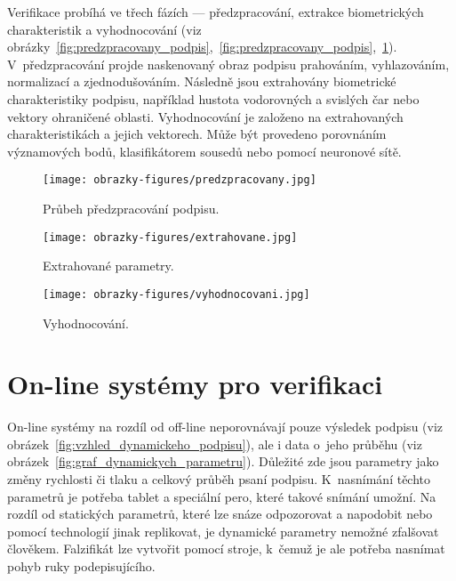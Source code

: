 Verifikace probíhá ve třech fázích --- předzpracování, extrakce biometrických charakteristik a vyhodnocování (viz obrázky~\ref{fig:predzpracovany_podpis},~\ref{fig:predzpracovany_podpis},~\ref{fig:vyhodnocovani}). %
V~předzpracování projde naskenovaný obraz podpisu prahováním, vyhlazováním, normalizací a zjednodušováním. %
Následně jsou extrahovány biometrické charakteristiky podpisu,                                             %
například hustota vodorovných a svislých čar nebo vektory ohraničené oblasti.                              %
Vyhodnocování je založeno na extrahovaných charakteristikách a jejich vektorech.                           %
Může být provedeno porovnáním významových bodů, klasifikátorem sousedů nebo  pomocí neuronové sítě.\cite{RakRoman2008}%

\begin{figure}[H]
  \centering
  \begin{minipage}{1\textwidth}
    \centering
    \texttt{[image: obrazky-figures/predzpracovany.jpg]}
    \caption{Průbeh předzpracování podpisu.~\cite{DrahanskýMartin2011}}
    \label{fig:predzpracovany_podpis}
  \end{minipage}\hfill
  \begin{minipage}{0.35\textwidth}
    \centering
    \texttt{[image: obrazky-figures/extrahovane.jpg]}
    \caption{Extrahované parametry.~\cite{RakRoman2008}}
    \label{fig:extrahovany}
  \end{minipage}\hfill
  \begin{minipage}{0.6\textwidth}
    \centering
    \texttt{[image: obrazky-figures/vyhodnocovani.jpg]}
    \caption{Vyhodnocování.~\cite{RakRoman2008}}
    \label{fig:vyhodnocovani}
  \end{minipage}
\end{figure}


\section{On-line systémy pro verifikaci} 
On-line systémy na rozdíl od off-line neporovnávají pouze výsledek podpisu (viz obrázek~\ref{fig:vzhled_dynamickeho_podpisu}), ale i data o~jeho průběhu (viz obrázek~\ref{fig:graf_dynamickych_parametru}). %
Důležité zde jsou parametry jako změny rychlosti či tlaku a celkový průběh psaní podpisu.     %
K~nasnímání těchto parametrů je potřeba tablet a speciální pero, které takové snímání umožní. %
Na rozdíl od statických parametrů, které lze snáze odpozorovat a napodobit                    %
nebo pomocí technologií jinak replikovat, je dynamické parametry nemožné zfalšovat člověkem.  %
Falzifikát lze vytvořit pomocí stroje, k~čemuž je ale potřeba nasnímat pohyb ruky podepisujícího.~\cite{VaccaJohnR2007}%

